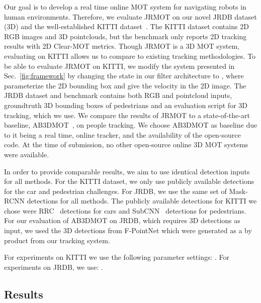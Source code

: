 \documentclass[letterpaper, 10 pt, conference]{ieeeconf}
\newcommand{\jrdb}{JRDB\xspace}
\newcommand{\methodname}{{JRMOT}\xspace}
\begin{document}
Our goal is to develop a real time online MOT system for navigating robots in human environments. Therefore, we evaluate \methodname on our novel \jrdb dataset (3D) and the well-established KITTI dataset~\cite{geiger2013vision}.
The KITTI dataset contains 2D RGB images and 3D pointclouds, but the benchmark only reports 2D tracking results with 2D Clear-MOT metrics. 
Though \methodname is a 3D MOT system, evaluating on KITTI allows us to compare to existing tracking methodologies.
To be able to evaluate \methodname on KITTI, we modify the system presented in Sec.~\ref{fig:framework} by changing the state in our filter architecture to , 
where  parameterize the 2D bounding box and  give the velocity in the 2D image.
The \jrdb dataset and benchmark contains both RGB and pointcloud inputs, groundtruth 3D bounding boxes of pedestrians and an evaluation script for 3D tracking, which we use. We compare the results of \methodname to a state-of-the-art baseline, AB3DMOT~\cite{Weng2019_3dmot}, on people tracking. We choose AB3DMOT as baseline due to it being a real time, online tracker, and the availability of the open-source code. At the time of submission, no other open-source online 3D MOT systems were available.

In order to provide comparable results, we aim to use identical detection inputs for all methods. For the KITTI dataset, we only use publicly available detections for the car and pedestrian challenges. For \jrdb, we use the same set of  Mask-RCNN detections for all methods.
The publicly available detections for KITTI we chose were RRC~\cite{DBLP:journals/corr/RenCLSPYTX17} detections for cars and SubCNN~\cite{7926691} detections for pedestrians.
For our evaluation of AB3DMOT on \jrdb, which requires 3D detections as input, we used the 3D detections from F-PointNet which were generated as a by product from our tracking system.

For experiments on KITTI we use the following parameter settings: . For experiments on JRDB, we use: .












\subsection*{Results}
\label{ss:res} 
\end{document}
